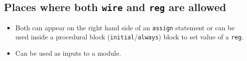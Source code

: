 \documentclass[a4paper,10pt]{article}
\theoremstyle{mytheor}
\newcommand{\inlinev}[1]{\lstinline[style=verilog-inline-style]{#1}}
\begin{document}
 \subsection{Places where both \inlinev{wire} and \inlinev{reg} are allowed}

 \begin{itemize}
 \item Both can appear on the right hand side of an
   \inlinev{assign} statement or can be
   used inside a procedural block
   (\inlinev{initial}/\inlinev{always})
   block to set value of a
   \inlinev{reg}.
 \item Can be used as inputs to a module.
\end{itemize}

\end{document}
